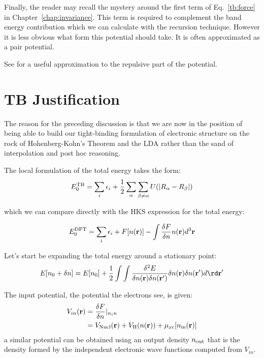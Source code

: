 Finally, the reader may recall the mystery around the first term 
of Eq.~\ref{tb:force} in Chapter~\ref{chap:invariance}. This term is required to complement
the band energy contribution which we can calculate with the recursion technique. However it is
less obvious what form this potential should take. It is often approximated as a pair potential.

See \cite{wolfsberger52} for a useful approximation to the repulsive part of 
the potential.


\section{TB Justification}
The reason for the preceding discussion is that we are now in
the position of being able to build our tight-binding formulation
of electronic structure on the rock of Hohenberg-Kohn's Theorem and
the LDA rather than the sand of interpolation and post hoc reasoning.

The local formulation of the total energy takes the form:
%
\begin{equation}
E_{0}^{\rm TB} = \sum_{i}\epsilon_{i} + \frac{1}{2}\sum_{\alpha} \sum_{\beta \ne \alpha}U(|R_{\alpha} -R_{\beta}|)
\end{equation}
%

which we can compare directly with the HKS expression for the total energy:

\begin{equation}
E_{0}^{\rm DFT} = \sum_{i}\epsilon_{i} + F[n({\bf r})] - \int \frac{\delta F}{\delta n}n({\bf r})d^{3}{\bf r}
\end{equation}

Let's start be expanding the total energy around a stationary point:
%
\begin{equation}
E[n_{0} + \delta n] = E[n_{0}] + \frac{1}{2}\int\int \frac{\delta^{2} E}{\delta n(\r) \delta n(\r')} \delta n(\r)\delta n(\r')d\rd\r'
\end{equation}
%

The input potential, the potential the electrons see, is given:
%
\begin{align}
V_{in}({\bf r})  & = \frac{\delta F} {\delta n}|_{n_in} \\
            & = V_{\rm Nucl}({\bf r}) + V_{\rm H}(n({\bf r})) + \mu_{xc}[n_{\rm in}({\bf r})]
\end{align}
%
a similar potential can be obtained using an output density $n_{\rm out}$
that is the density formed by the independent electronic wave functions
computed from $V_{in}$.

